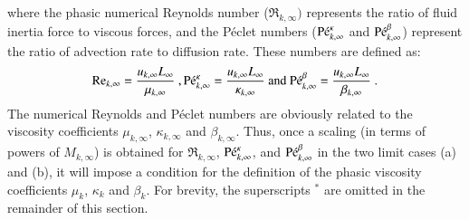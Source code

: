 \documentclass[preprint,10pt]{elsarticle}
\begin{document}
%
where the phasic numerical Reynolds number ($\Re_{k,\infty})$ represents the ratio of fluid inertia force to viscous forces, and 
the P\'eclet numbers ($\textrm{P\'e}_{k,\infty}^\kappa$ and $\textrm{P\'e}_{k,\infty}^\beta$) represent the ratio of advection rate to diffusion rate. These numbers are defined as:
%
\begin{equation}
\label{eq:ref_numb}
\Re_{k,\infty} = \frac{u_{k,\infty} L_\infty}{\mu_{k,\infty}} \ ,
\Pe_{k,\infty}^\kappa = \frac{u_{k,\infty} L_\infty}{\kappa_{k,\infty}} \text{ and }
\Pe_{k,\infty}^\beta = \frac{u_{k,\infty} L_\infty}{\beta_{k,\infty}} \ .
\end{equation}
%
The numerical Reynolds and P\'eclet numbers are obviously related to the 
viscosity coefficients $\mu_{k,\infty}$, $\kappa_{k,\infty}$ and $\beta_{k,\infty}$. Thus, once a scaling (in terms of powers of $M_{k,\infty}$) 
is obtained for $\Re_{k,\infty}$, $\textrm{P\'e}_{k,\infty}^\kappa$, and $\textrm{P\'e}_{k,\infty}^\beta$ in the two limit cases (a) and (b), it will 
impose a condition for the definition of the phasic viscosity coefficients $\mu_k$, $\kappa_k$ and $\beta_k$. For brevity, the superscripts $^*$ are omitted in the remainder of this section. 

\end{document}
